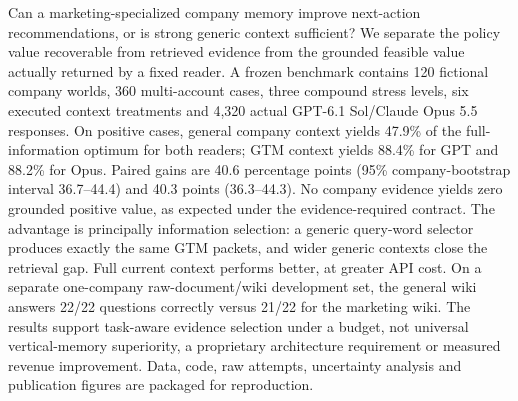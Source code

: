 Can a marketing-specialized company memory improve next-action recommendations, or is strong generic context sufficient? We separate the policy value recoverable from retrieved evidence from the grounded feasible value actually returned by a fixed reader. A frozen benchmark contains 120 fictional company worlds, 360 multi-account cases, three compound stress levels, six executed context treatments and 4,320 actual GPT-6.1 Sol/Claude Opus 5.5 responses. On positive cases, general company context yields 47.9\% of the full-information optimum for both readers; GTM context yields 88.4\% for GPT and 88.2\% for Opus. Paired gains are 40.6 percentage points (95\% company-bootstrap interval 36.7--44.4) and 40.3 points (36.3--44.3). No company evidence yields zero grounded positive value, as expected under the evidence-required contract. The advantage is principally information selection: a generic query-word selector produces exactly the same GTM packets, and wider generic contexts close the retrieval gap. Full current context performs better, at greater API cost. On a separate one-company raw-document/wiki development set, the general wiki answers 22/22 questions correctly versus 21/22 for the marketing wiki. The results support task-aware evidence selection under a budget, not universal vertical-memory superiority, a proprietary architecture requirement or measured revenue improvement. Data, code, raw attempts, uncertainty analysis and publication figures are packaged for reproduction.
